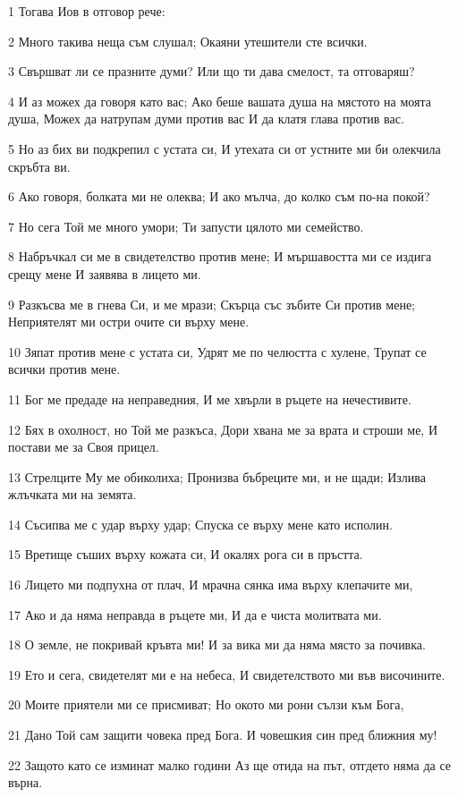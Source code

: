 \par 1 Тогава Иов в отговор рече:
\par 2 Много такива неща съм слушал; Окаяни утешители сте всички.
\par 3 Свършват ли се празните думи? Или що ти дава смелост, та отговаряш?
\par 4 И аз можех да говоря като вас; Ако беше вашата душа на мястото на моята душа, Можех да натрупам думи против вас И да клатя глава против вас.
\par 5 Но аз бих ви подкрепил с устата си, И утехата си от устните ми би олекчила скръбта ви.
\par 6 Ако говоря, болката ми не олеква; И ако мълча, до колко съм по-на покой?
\par 7 Но сега Той ме много умори; Ти запусти цялото ми семейство.
\par 8 Набръчкал си ме в свидетелство против мене; И мършавостта ми се издига срещу мене И заявява в лицето ми.
\par 9 Разкъсва ме в гнева Си, и ме мрази; Скърца със зъбите Си против мене; Неприятелят ми остри очите си върху мене.
\par 10 Зяпат против мене с устата си, Удрят ме по челюстта с хулене, Трупат се всички против мене.
\par 11 Бог ме предаде на неправедния, И ме хвърли в ръцете на нечестивите.
\par 12 Бях в охолност, но Той ме разкъса, Дори хвана ме за врата и строши ме, И постави ме за Своя прицел.
\par 13 Стрелците Му ме обиколиха; Пронизва бъбреците ми, и не щади; Излива жлъчката ми на земята.
\par 14 Съсипва ме с удар върху удар; Спуска се върху мене като исполин.
\par 15 Вретище съших върху кожата си, И окалях рога си в пръстта.
\par 16 Лицето ми подпухна от плач, И мрачна сянка има върху клепачите ми,
\par 17 Ако и да няма неправда в ръцете ми, И да е чиста молитвата ми.
\par 18 О земле, не покривай кръвта ми! И за вика ми да няма място за почивка.
\par 19 Ето и сега, свидетелят ми е на небеса, И свидетелството ми във височините.
\par 20 Моите приятели ми се присмиват; Но окото ми рони сълзи към Бога,
\par 21 Дано Той сам защити човека пред Бога. И човешкия син пред ближния му!
\par 22 Защото като се изминат малко години Аз ще отида на път, отгдето няма да се върна.

